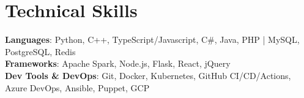 \section{Technical Skills}
\begin{itemize}[leftmargin=0.15in, label={}]
    \small{\item{
        \textbf{Languages}{: Python, C++, TypeScript/Javascript, C\#, Java, PHP | MySQL, PostgreSQL, Redis} \\
        \textbf{Frameworks}{: Apache Spark, Node.js, Flask, React, jQuery} \\
        \textbf{Dev Tools \& DevOps}{: Git, Docker, Kubernetes, GitHub CI/CD/Actions, Azure DevOps, Ansible, Puppet, GCP} \\
    }}
\end{itemize}
